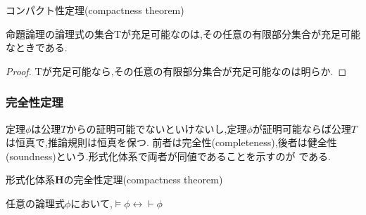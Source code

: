 \begin{thm}
 \label{compactness_thm}
 コンパクト性定理(compactness theorem)

 命題論理の論理式の集合Tが充足可能なのは,その任意の有限部分集合が充足可能なときである.

\end{thm}
\begin{proof}
 Tが充足可能なら,その任意の有限部分集合が充足可能なのは明らか.
\end{proof}

\subsubsection{完全性定理}
定理$\phi$は公理$T$からの証明可能でないといけないし,定理$\phi$が証明可能ならば公理$T$は恒真で,推論規則は恒真を保つ.
前者は完全性(completeness),後者は健全性(soundness)という.形式化体系で両者が同値であることを示すのが
である.

\begin{thm}
 \label{H_completeness}
 形式化体系$\bm{H}$の完全性定理(compactness theorem)

 任意の論理式$\phi$において,$\models \phi \leftrightarrow \vdash \phi$
\end{thm}

